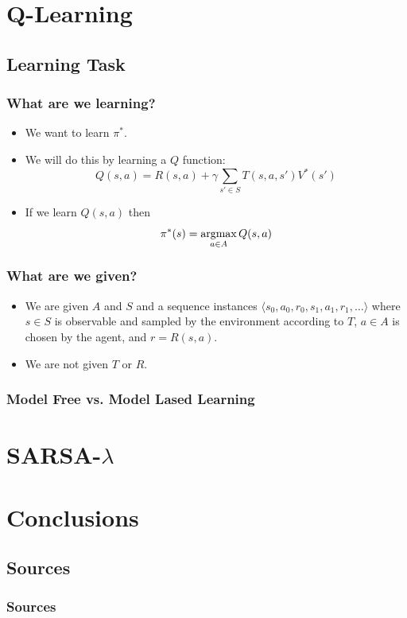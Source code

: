 \documentclass[ignorenonframetext]{beamer}
\newcommand{\argmax}{\operatornamewithlimits{argmax}}
\begin{document}
\section{Q-Learning}
\subsection{Learning Task}
\begin{frame}
	\frametitle{What are we learning?}
	\begin{itemize}
		\item We want to learn $\pi^*$.
		\item We will do this by learning a $Q$ function:
			\[
			Q(s,a) = R(s,a) + \gamma \sum_{s' \in S}T(s,a, s') V^*(s')
			\]
		\item If we learn $Q(s,a)$ then 
			\[
			\pi^*(s) = \argmax_{a\in A} Q(s,a)
			\]
	\end{itemize}
\end{frame}

\begin{frame}
	\frametitle{What are we given?}
	\begin{itemize}
		\item We are given $A$ and $S$ and a sequence instances
			$\langle s_0,a_0,r_0,s_1,a_1,r_1,\dots \rangle$
			where $s \in S$ is observable and sampled by the environment
			according to $T$, $a\in A$ is chosen by the agent, and $r =
			R(s,a)$.
		\item We are not given $T$ or $R$.
	\end{itemize}
\end{frame}

\begin{frame}
	\frametitle{Model Free vs. Model Lased Learning}
\end{frame}


\begin{frame}
\end{frame}


\section{SARSA-$\lambda$}


\section{Conclusions}

\subsection{Sources}
\begin{frame}[allowframebreaks]
	\frametitle{Sources}
	\nocite{*}
	
	
\end{frame}
\end{document}
